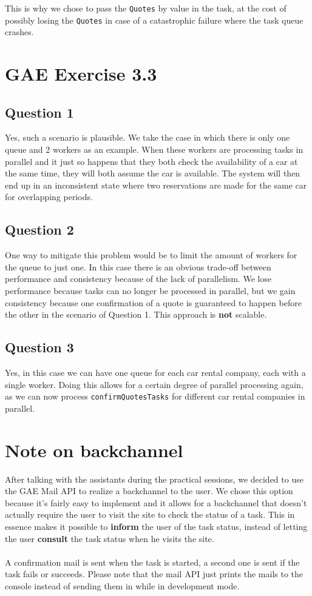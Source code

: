 \documentclass[]{article}
\begin{document}
This is why we chose to pass the \texttt{Quotes} by value in the task, at the cost of possibly losing the \texttt{Quotes} in case of a catastrophic failure where the task queue crashes.
\newpage
\section{GAE Exercise 3.3}
\subsection{Question 1}

Yes, such a scenario is plausible. We take the case in which there is only one queue and 2 workers as an example. When these workers are processing tasks in parallel and it just so happens that they both check the availability of a car at the same time, they will both assume the car is available. The system will then end up in an inconsistent state where two reservations are made for the same car for overlapping periods.

\subsection{Question 2}

One way to mitigate this problem would be to limit the amount of workers for the queue to just one. In this case there is an obvious trade-off between performance and consistency because of the lack of parallelism. We lose performance because tasks can no longer be processed in parallel, but we gain consistency because one confirmation of a quote is guaranteed to happen before the other in the scenario of Question 1. This approach is \textbf{not} scalable.

\subsection{Question 3}

Yes, in this case we can have one queue for each car rental company, each with a single worker.
Doing this allows for a certain degree of parallel processing again, as we can now process \texttt{confirmQuotesTasks} for different car rental companies in parallel.

\section{Note on backchannel}

After talking with the assistants during the practical sessions, we decided to use the GAE Mail API to realize a backchannel to the user. We chose this option because it's fairly easy to implement and it allows for a backchannel that doesn't actually require the user to visit the site to check the status of a task. This in essence makes it possible to \textbf{inform} the user of the task status, instead of letting the user \textbf{consult} the task status when he visits the site. \\\\
A confirmation mail is sent when the task is started, a second one is sent if the task fails or succeeds. Please note that the mail API just prints the mails to the console instead of sending them in while in development mode.
\end{document}
